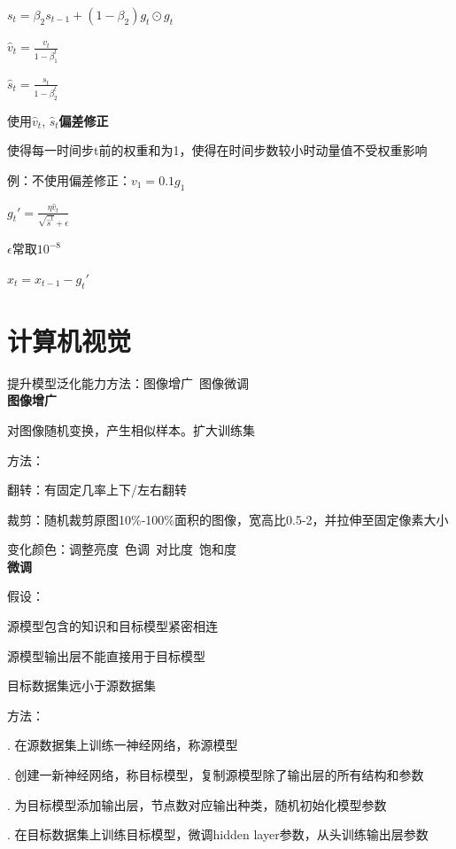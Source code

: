 \documentclass[UTF8]{ctexart}
\begin{document}
  \quad $s_t = \beta_2 s_{t-1} + (1-\beta_2)g_t \odot g_t$

  \quad $\hat{v}_t = \frac{v_t}{1-\beta_1^t}$

  \quad $\hat{s}_t = \frac{s_t}{1-\beta_2^t}$

  \quad \quad 使用$\hat{v}_t$, $\hat{s}_t$\textbf{偏差修正}
  
  \quad \quad \quad 使得每一时间步t前的权重和为1，使得在时间步数较小时动量值不受权重影响

  \quad \quad \quad \quad 例：不使用偏差修正：$v_1 = 0.1g_1$

  \quad $g_t' = \frac{\eta \hat{v}_t}{\sqrt{\hat{s}^t} + \epsilon}$

  \quad \quad $\epsilon $常取$10^{-8}$

  \quad $x_t = x_{t-1} - g_t'$


\section{计算机视觉}
\noindent 提升模型泛化能力方法：图像增广\ 图像微调\\
\textbf{图像增广}

  对图像随机变换，产生相似样本。扩大训练集

  方法：

  \quad 翻转：有固定几率上下/左右翻转

  \quad 裁剪：随机裁剪原图10\%-100\%面积的图像，宽高比0.5-2，并拉伸至固定像素大小

  \quad 变化颜色：调整亮度\ 色调\ 对比度\ 饱和度\\
\textbf{微调}

  假设：

  \quad 源模型包含的知识和目标模型紧密相连
  
  \quad 源模型输出层不能直接用于目标模型

  \quad 目标数据集远小于源数据集

  方法：
 
  . 在源数据集上训练一神经网络，称源模型

  . 创建一新神经网络，称目标模型，复制源模型除了输出层的所有结构和参数

  . 为目标模型添加输出层，节点数对应输出种类，随机初始化模型参数

  . 在目标数据集上训练目标模型，微调hidden layer参数，从头训练输出层参数
\end{document}
